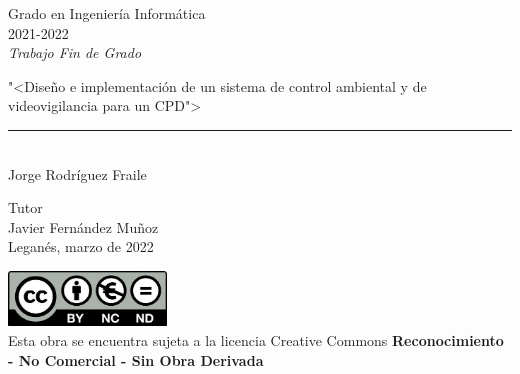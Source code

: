 \begin{titlepage}
	\begin{sffamily}
		\color{azulUC3M}
		\begin{center}
			\begin{figure}[H] %
				\label{fig:portadaLogo}
			\end{figure}
			\vspace{2.5cm}
			\begin{Large}
				Grado en Ingeniería Informática\\
				2021-2022\\
				\vspace{2cm}
				\textsl{Trabajo Fin de Grado}
				\bigskip
				
			\end{Large}
			{\Huge "<Diseño e implementación de un sistema de control ambiental y de videovigilancia para un CPD">}\\
			\vspace*{0.5cm}
			\rule{10.5cm}{0.1mm}\\
			\vspace*{0.9cm}
			{\LARGE Jorge Rodríguez Fraile}\\
			\vspace*{1cm}
			\begin{Large}
				Tutor\\
				Javier Fernández Muñoz\\
				Leganés, marzo de 2022\\
			\end{Large}
		\end{center}
		\vfill
		\color{black}
		\includegraphics[width=4.2cm]{imagenes/creativecommons.jpg}\\ %
		Esta obra se encuentra sujeta a la licencia Creative Commons \textbf{Reconocimiento - No Comercial - Sin Obra Derivada}
	\end{sffamily}
\end{titlepage}